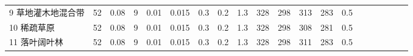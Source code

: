 \begin{landscape}
\begin{table}[htbp]
\begin{tabular}{@{}lccccccccccccccccccc@{}}
    9 草地灌木地混合带     & 52                                                                & 0.08                                                                                                   & 9                                                                                  & 0.01                                                                               & 0.015                                                               & 0.3                                                       & 0.2                                                       & 1.3                                                       & 328                                                             & 298                                                             & 313                                                              & 283                                                               & 0.5                                                          \\
    10 稀疏草原        & 52                                                                & 0.08                                                                                                   & 9                                                                                  & 0.01                                                                               & 0.015                                                               & 0.3                                                       & 0.2                                                       & 1.3                                                       & 328                                                             & 298                                                             & 308                                                              & 281                                                               & 0.5                                                          \\
    11 落叶阔叶林       & 52                                                                & 0.08                                                                                                   & 9                                                                                  & 0.01                                                                               & 0.015                                                               & 0.3                                                       & 0.2                                                       & 1.3                                                       & 328                                                             & 298                                                             & 311                                                              & 283                                                               & 0.5                                                          \\

\end{tabular}
\end{table}
\end{landscape}
